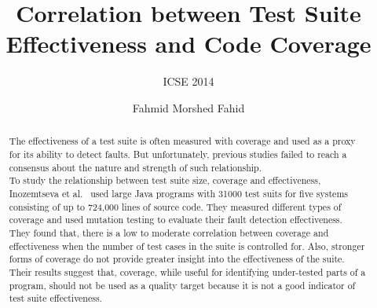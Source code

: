 \documentclass[sigconf]{acmart}
\begin{document}
\title{Correlation between Test Suite Effectiveness and Code Coverage}%
\subtitle{ICSE 2014}


\author{Fahmid Morshed Fahid}

\begin{abstract}
The effectiveness of a test suite is often measured with coverage and used as a proxy for its ability to detect faults. But unfortunately, previous studies failed to reach a consensus about the nature and strength of such relationship. \\ %
To study the relationship between test suite size, coverage and effectiveness, Inozemtseva et al.~\cite{inozemtseva2014coverage} used large Java programs with 31000 test suits for five systems consisting of up to 724,000 lines of source code. They measured different types of coverage and used mutation testing to evaluate their fault detection effectiveness.\\
They found that, there is a low to moderate correlation between coverage and effectiveness when the number of test cases in the suite is controlled for. Also, stronger forms of coverage do not provide greater insight into the effectiveness of the suite. Their results suggest that, coverage, while useful for identifying under-tested parts of a program, should not be used as a quality target because it is not a good indicator of test suite effectiveness.

\end{abstract}


\maketitle




%



\end{document}
